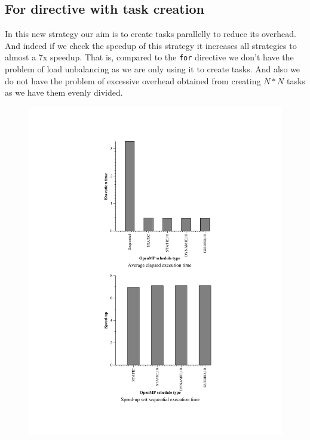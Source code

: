 \documentclass[11pt]{article}
\begin{document}
\subsection{For directive with task creation}
In this new strategy our aim is to create tasks parallelly to reduce its overhead. And indeed if we check the speedup of this strategy it increases all strategies to almost a 7x speedup. That is, compared to the \texttt{for} directive we don't have the problem of load unbalancing as we are only using it to create tasks. And also we do not have the problem of excessive overhead obtained from creating \(N*N\) tasks as we have them evenly divided.

\begin{figure}[!htb]
  \centerline{\includegraphics[width=0.9\linewidth]{./For/ForTask/fortask.pdf}}
\end{figure}
\end{document}
